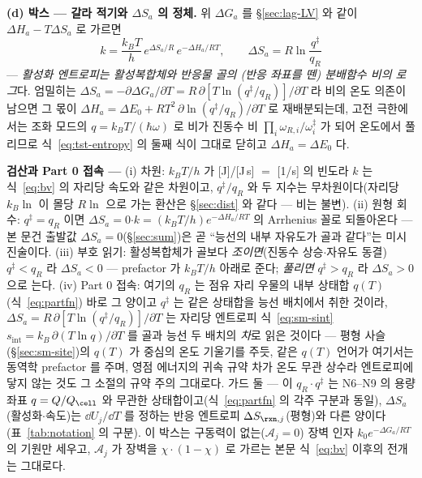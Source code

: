 \begin{bgbox}
\textbf{(d) 박스 --- 갈라 적기와 $\Delta S_a$ 의 정체.} 위 $\Delta G_a$ 를 \S\ref{sec:lag-LV} 와 같이
$\Delta H_a-T\Delta S_a$ 로 가르면
\begin{equation}
\boxed{\;k=\frac{k_BT}{h}\,e^{\Delta S_a/R}\,e^{-\Delta H_a/RT},\qquad
\Delta S_a=R\ln\frac{q^\ddagger}{q_R}\;}
\label{eq:tst-entropy}
\end{equation}
--- \emph{활성화 엔트로피는 활성복합체와 반응물 골의 (반응 좌표를 뗀) 분배함수 비의 로그}다. 엄밀히는
$\Delta S_a=-\partial\Delta G_a/\partial T=R\,\partial[T\ln(q^\ddagger/q_R)]/\partial T$ 라 비의 온도
의존이 남으면 그 몫이 $\Delta H_a=\Delta E_0+RT^2\,\partial\ln(q^\ddagger/q_R)/\partial T$ 로
재배분되는데, 고전 극한에서는 조화 모드의 $q=k_BT/(\hbar\omega)$ 로 비가 진동수 비
$\prod_i\omega_{R,i}/\omega^\ddagger_i$ 가 되어 온도에서 풀리므로 식~\eqref{eq:tst-entropy} 의 둘째 식이
그대로 닫히고 $\Delta H_a=\Delta E_0$ 다.

\textbf{검산과 Part 0 접속 ---} (i) 차원: $k_BT/h$ 가 [J]/[J\,s] $=$ [1/s] 의 빈도라 $k$ 는
식~\eqref{eq:bv} 의 자리당 속도와 같은 차원이고, $q^\ddagger/q_R$ 와 두 지수는 무차원이다(자리당
$k_B\ln$ 이 몰당 $R\ln$ 으로 가는 환산은 \S\ref{sec:dist} 와 같다 --- 비는 불변). (ii) 원형 회수:
$q^\ddagger=q_R$ 이면 $\Delta S_a=0$$\cdot$$k=(k_BT/h)e^{-\Delta H_a/RT}$ 의 Arrhenius 꼴로 되돌아온다
--- 본 문건 출발값 $\Delta S_a=0$(\S\ref{sec:sum})은 곧 ``능선의 내부 자유도가 골과 같다''는 미시
진술이다. (iii) 부호 읽기: 활성복합체가 골보다 \emph{조이면}(진동수 상승$\cdot$자유도 동결)
$q^\ddagger<q_R$ 라 $\Delta S_a<0$ --- prefactor 가 $k_BT/h$ 아래로 준다; \emph{풀리면} $q^\ddagger>q_R$
라 $\Delta S_a>0$ 으로 는다. (iv) Part 0 접속: 여기의 $q_R$ 는 점유 자리 우물의 내부 상태합
$q(T)$(식~\eqref{eq:partfn}) 바로 그 양이고 $q^\ddagger$ 는 같은 상태합을 능선 배치에서 취한 것이라,
$\Delta S_a=R\,\partial[T\ln(q^\ddagger/q_R)]/\partial T$ 는 자리당 엔트로피 식~\eqref{eq:sm-sint}
$s_\mathrm{int}=k_B\,\partial(T\ln q)/\partial T$ 를 골과 능선 두 배치의 \emph{차}로 읽은 것이다 ---
평형 사슬(\S\ref{sec:sm-site})의 $q(T)$ 가 중심의 온도 기울기를 주듯, 같은 $q(T)$ 언어가 여기서는
동역학 prefactor 를 주며, 영점 에너지의 귀속 규약 차가 온도 무관 상수라 엔트로피에 닿지 않는 것도 그
소절의 규약 주의 그대로다. 가드 둘 --- 이 $q_R\cdot q^\ddagger$ 는 N6--N9 의 용량 좌표 $q=Q/Q_\cell$
와 무관한 상태합이고(식~\eqref{eq:partfn} 의 각주 구분과 동일), $\Delta S_a$(활성화$\cdot$속도)는
$\dd U_j/\dd T$ 를 정하는 반응 엔트로피 $\Delta S_{\rxn,j}$(평형)와 다른 양이다(표~\ref{tab:notation}
의 구분). 이 박스는 구동력이 없는($\mathcal A_j=0$) 장벽 인자 $k_0e^{-\Delta G_a/RT}$ 의 기원만 세우고,
$\mathcal A_j$ 가 장벽을 $\chi\cdot(1-\chi)$ 로 가르는 본문 식~\eqref{eq:bv} 이후의 전개는 그대로다.
\end{bgbox}

